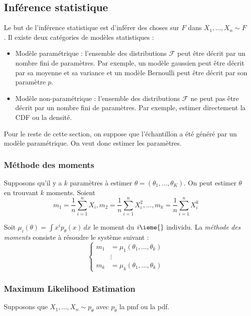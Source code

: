 \subsection{Inférence statistique}
    Le but de l'inférence statistique est d'inférer des choses sur \(F\) dans \(X_1, \dots, X_n \sim F\). Il existe deux catégories de modèles statistiques :
    \begin{itemize}
        \item Modèle paramétrique : l'ensemble des distributions \(\mathcal{F}\) peut être décrit par un nombre fini de paramètres. Par exemple, un modèle gaussien peut être décrit par sa moyenne et sa variance et un modèle Bernoulli peut être décrit par son paramètre \(p\).
        \item Modèle non-paramétrique : l'ensemble des distributions \(\mathcal{F}\) ne peut pas être décrit par un nombre fini de paramètres. Par exemple, estimer directement la CDF ou la densité.
    \end{itemize}

    Pour le reste de cette section, on suppose que l'échantillon a été généré par un modèle paramétrique. On veut donc estimer les paramètres.

    \subsubsection{Méthode des moments}
        Supposons qu'il y a \(k\) paramètres à estimer \(\theta = (\theta_1, \dots, \theta_K)\). On peut estimer \(\theta\) en trouvant \(k\) moments. Soient
        \[
            m_1 = \frac{1}{n} \sum_{i=1}^n X_i, m_2 = \frac{1}{n} \sum_{i=1}^n X_i^2, \dots, m_k = \frac{1}{n} \sum_{i=1}^n X_i^k
        \]

        Soit \(\mu_i(\theta) = \int x^i p_\theta(x)\,dx\) le moment du \(i\ieme{}\) individu. La \textit{méthode des moments} consiste à résoudre le système suivant :
        \[
            \begin{cases}
                m_1 &= \mu_1(\theta_1, \dots, \theta_k)\\
                &\vdots\\
                m_k &= \mu_k(\theta_1, \dots, \theta_k)
            \end{cases}
        \]

    \subsubsection{Maximum Likelihood Estimation}
        Supposons que \(X_1, \dots, X_n \sim p_\theta\) avec \(p_\theta\) la pmf ou la pdf.

